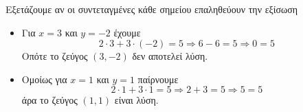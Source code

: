 \begin{alist}
\item Εξετάζουμε αν οι συντεταγμένες κάθε σημείου επαληθεύουν την εξίσωση
\begin{itemize}
\item Για $ x=3 $ και $ y=-2 $ έχουμε
\[ 2\cdot 3+3\cdot (-2)=5\Rightarrow 6-6=5\Rightarrow 0=5 \]
Οπότε το ζεύγος $ (3,-2) $ δεν αποτελεί λύση.
\item Ομοίως για $ x=1 $ και $ y=1 $ παίρνουμε
\[ 2\cdot 1+3\cdot 1=5\Rightarrow 2+3=5\Rightarrow 5=5 \]
άρα το ζεύγος $ (1,1) $ είναι λύση.
\end{itemize}
\end{alist}
